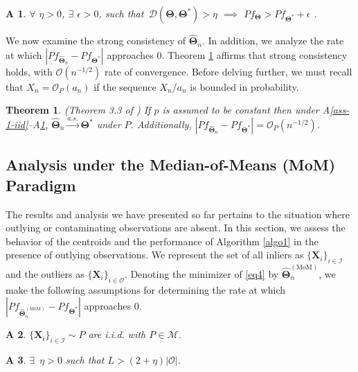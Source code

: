 \documentclass{article}
\newcommand{\bX}{\boldsymbol{X}}
\newcommand{\bTheta}{\boldsymbol{\Theta}}
\newcommand{\I}{\mathcal{I}}
\newcommand{\cO}{\mathcal{O}}
\newcommand{\hth}{\widehat{\bTheta}_n}
\newcommand{\tm}{\widehat{\bTheta}_n^{(\text{MoM})}}
\newtheorem{thm}{Theorem}[section]
\newtheorem{assumption}{A\hspace{-2pt}}
\begin{document}
\begin{assumption}\label{ass-3-diss}
    $\forall$ $ \eta>0$, $\exists$ $\epsilon>0$, such that $\, \mathcal{D}(\bTheta,\bTheta^\ast)> \eta$ $\implies$ $P f_{\bTheta} > P f_{\bTheta^\ast} + \epsilon$ .
\end{assumption}

We now examine the strong consistency of $\hth$. In addition, we analyze the rate at which $|P f_{\hth} - P f_{\bTheta^\ast}|$ approaches $0$. Theorem \ref{thm-3-strong-consistency} affirms that strong consistency holds, with $\mathcal{O}(n^{-1/2})$ rate of convergence. Before delving further, we must recall that $X_n = \mathcal{O}_P(a_n)$ if the sequence $X_n/a_n$ is bounded in probability.

\begin{thm}\label{thm-3-strong-consistency}
(Theorem 3.3 of \cite{paul2021uniform}) If $p$ is assumed to be constant then under  A\ref{ass-1-iid}--A\ref{ass-3-diss}, $\hth \xrightarrow{a.s.} \bTheta^\ast$ under $P$. Additionally, $|P f_{\hth} - P f_{\bTheta^\ast}| = \mathcal{O}_P (n^{-1/2})$.
\end{thm}


\subsection{Analysis under the Median-of-Means (MoM) Paradigm}

The results and analysis we have presented so far pertains to the situation where outlying or contaminating observations are absent. In this section, we assess the behavior of the centroids and the performance of Algorithm \ref{algo1} in the presence of outlying observations. %
  We represent the set of all inliers as $\{\bX_i\}_{i \in \I}$ and the outliers as $\{\bX_i\}_{i \in \cO}$. Denoting the  minimizer of \eqref{eq4} by $\tm$, we make the following assumptions for determining the rate at which $|Pf_{\tm} - Pf_{\bTheta^\ast}|$ approaches $0$. %

\begin{assumption}\label{ass-4-iid}
    $\{\bX_i\}_{i \in \I}\sim P$ are i.i.d. with $P \in \mathcal{M}$.
\end{assumption}

\begin{assumption}\label{ass-5-L}
    $\exists$ $\, \eta > 0$ such that $L>(2+\eta)|\cO|$.
\end{assumption}
\end{document}
